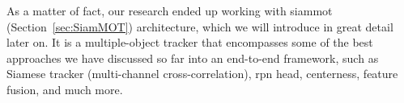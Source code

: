 As a matter of fact, our research ended up working with \gls{siammot}~\cite{shuai2021siammot} (Section~\ref{sec:SiamMOT}) architecture, which we will introduce in great detail later on. It is a multiple-object tracker that encompasses some of the best approaches we have discussed so far into an end-to-end framework, such as Siamese tracker (multi-channel cross-correlation), \gls{rpn} head, centerness, feature fusion, and much more.
